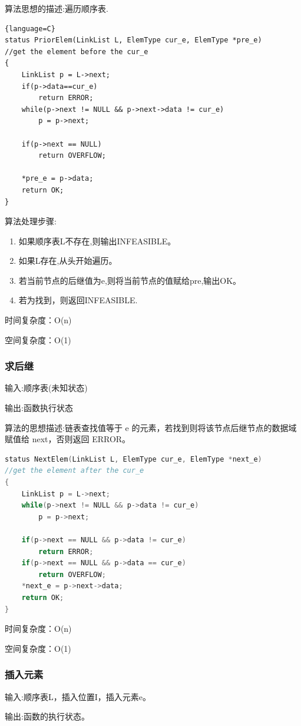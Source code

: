 \documentclass[supercite]{Experimental_Report}
\theoremstyle{definition}
\begin{document}
算法思想的描述:遍历顺序表.
\begin{lstlisting}{language=C}
status PriorElem(LinkList L, ElemType cur_e, ElemType *pre_e)
//get the element before the cur_e
{
	LinkList p = L->next;
	if(p->data==cur_e) 
		return ERROR;
	while(p->next != NULL && p->next->data != cur_e)
		p = p->next;

	if(p->next == NULL)
		return OVERFLOW;

	*pre_e = p->data;
	return OK;
}
\end{lstlisting}
算法处理步骤:
\begin{enumerate}
	\renewcommand{\labelenumi}{\theenumi)}
	\item 如果顺序表L不存在,则输出INFEASIBLE。
	\item 如果L存在,从头开始遍历。
	\item 若当前节点的后继值为e,则将当前节点的值赋给pre,输出OK。
	\item 若为找到，则返回INFEASIBLE.
\end{enumerate}

时间复杂度：O(n)

空间复杂度：O(1)
\subsubsection{求后继}
输入:顺序表(未知状态)

输出:函数执行状态

算法的思想描述:链表查找值等于 e 的元素，若找到则将该节点后继节点的数据域赋值给 next，否则返回 ERROR。	
\begin{lstlisting}[language=C] 
status NextElem(LinkList L, ElemType cur_e, ElemType *next_e)
//get the element after the cur_e
{
	LinkList p = L->next;
	while(p->next != NULL && p->data != cur_e)
		p = p->next;
	
	if(p->next == NULL && p->data != cur_e)	
		return ERROR;
	if(p->next == NULL && p->data == cur_e)	
		return OVERFLOW;
	*next_e = p->next->data;	
	return OK;
}

\end{lstlisting}

时间复杂度：O(n)

空间复杂度：O(1)
\subsubsection{插入元素}

输入:顺序表L，插入位置I，插入元素e。

输出:函数的执行状态。
\end{document}
